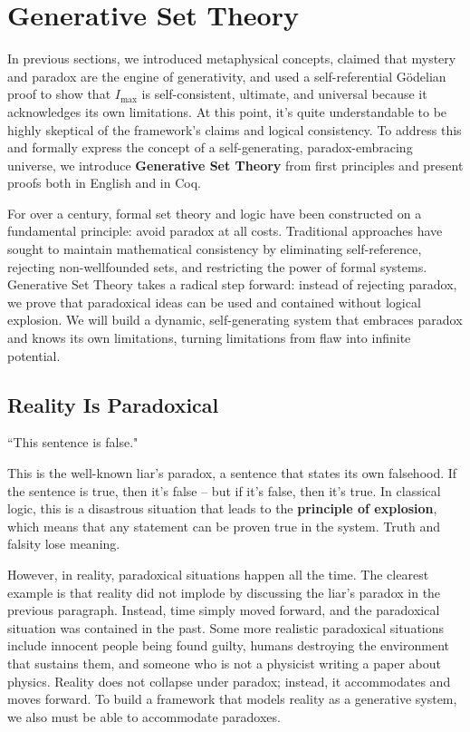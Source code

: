 \documentclass[12pt]{article}
\begin{document}
\section{Generative Set Theory}

In previous sections, we introduced metaphysical concepts, claimed that mystery and paradox are the engine of generativity, and used a self-referential Gödelian proof to show that $I_\text{max}$ is self-consistent, ultimate, and universal because it acknowledges its own limitations. At this point, it's quite understandable to be highly skeptical of the framework's claims and logical consistency. To address this and formally express the concept of a self-generating, paradox-embracing universe, we introduce \textbf{Generative Set Theory} from first principles and present proofs both in English and in Coq.

For over a century, formal set theory and logic have been constructed on a fundamental principle: avoid paradox at all costs. Traditional approaches have sought to maintain mathematical consistency by eliminating self-reference, rejecting non-wellfounded sets, and restricting the power of formal systems. Generative Set Theory takes a radical step forward: instead of rejecting paradox, we prove that paradoxical ideas can be used and contained without logical explosion. We will build a dynamic, self-generating system that embraces paradox and knows its own limitations, turning limitations from flaw into infinite potential.

\subsection{Reality Is Paradoxical}

``This sentence is false."

This is the well-known liar's paradox, a sentence that states its own falsehood. If the sentence is true, then it's false -- but if it's false, then it's true. In classical logic, this is a disastrous situation that leads to the \textbf{principle of explosion}, which means that any statement can be proven true in the system. Truth and falsity lose meaning.

However, in reality, paradoxical situations happen all the time. The clearest example is that reality did not implode by discussing the liar's paradox in the previous paragraph. Instead, time simply moved forward, and the paradoxical situation was contained in the past. Some more realistic paradoxical situations include innocent people being found guilty, humans destroying the environment that sustains them, and someone who is not a physicist writing a paper about physics. Reality does not collapse under paradox; instead, it accommodates and moves forward. To build a framework that models reality as a generative system, we also must be able to accommodate paradoxes.
\end{document}
